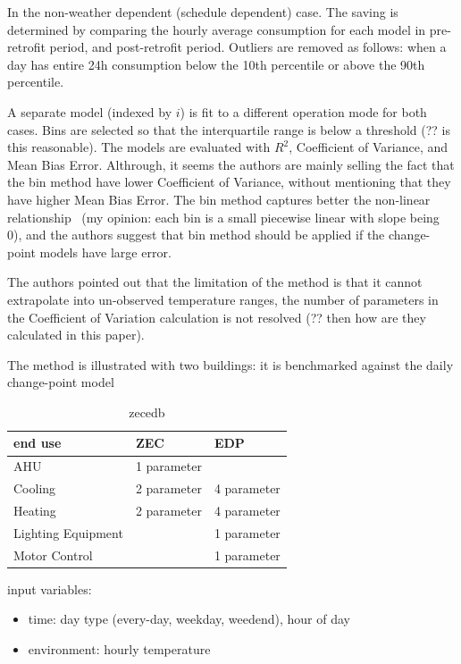 \documentclass[12pt]{article}
\begin{document}
In the non-weather dependent (schedule dependent) case.  The saving is
determined by comparing the hourly average consumption for each model
in pre-retrofit period, and post-retrofit period. Outliers are removed
as follows: when a day has entire 24h consumption below the 10th
percentile or above the 90th percentile.

A separate model (indexed by $i$) is fit to a different operation mode
for both cases. Bins are selected so that the interquartile range is
below a threshold (?? is this reasonable). The models are evaluated
with $R^2$, Coefficient of Variance, and Mean Bias Error. Althrough,
it seems the authors are mainly selling the fact that the bin method
have lower Coefficient of Variance, without mentioning that they have
higher Mean Bias Error. The bin method captures better the non-linear
relationship ~\cite{haberl1994bin}(my opinion: each bin is a small
piecewise linear with slope being 0), and the authors suggest that bin
method should be applied if the change-point models have large error.

The authors pointed out that the limitation of the method is that it
cannot extrapolate into un-observed temperature ranges, the number of
parameters in the Coefficient of Variation calculation is not
resolved (?? then how are they calculated in this paper).

The method is illustrated with two buildings: it is
benchmarked against the daily change-point model
\begin{table}[h!]
  \centering
  \begin{tabular}{l|l|l}
    \hline
    end use&ZEC&EDP\\
    \hline
    AHU&1 parameter&\\
    Cooling&2 parameter&4 parameter\\
    Heating&2 parameter&4 parameter\\
    Lighting Equipment&&1 parameter\\
    Motor Control&&1 parameter\\
    \hline
  \end{tabular}
  \caption{zecedb}
  \label{tab:zecedb}
\end{table}
\FloatBarrier

input variables:
\begin{itemize}
\item time: day type (every-day, weekday, weedend), hour of day
\item environment: hourly temperature
\end{itemize}
\end{document}

